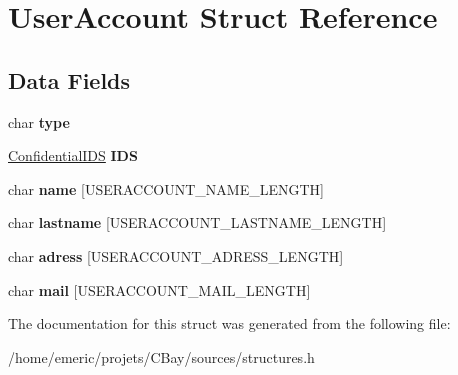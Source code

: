 \hypertarget{struct_user_account}{\section{User\-Account Struct Reference}
\label{struct_user_account}
}
\subsection*{Data Fields}
\begin{DoxyCompactItemize}
\item 
\hypertarget{struct_user_account_aff17911edc8208aa8ddb1c7c52c78389}{char {\bfseries type}}\label{struct_user_account_aff17911edc8208aa8ddb1c7c52c78389}

\item 
\hypertarget{struct_user_account_a588d1e5ad85c65bc2b00e9432faadc0e}{\hyperlink{struct_confidential_i_d_s}{Confidential\-I\-D\-S} {\bfseries I\-D\-S}}\label{struct_user_account_a588d1e5ad85c65bc2b00e9432faadc0e}

\item 
\hypertarget{struct_user_account_ab3f0e8a7b7c292feb10bb01486452533}{char {\bfseries name} \mbox{[}U\-S\-E\-R\-A\-C\-C\-O\-U\-N\-T\-\_\-\-N\-A\-M\-E\-\_\-\-L\-E\-N\-G\-T\-H\mbox{]}}\label{struct_user_account_ab3f0e8a7b7c292feb10bb01486452533}

\item 
\hypertarget{struct_user_account_a570366d76c40b10dee4a3db834bc53be}{char {\bfseries lastname} \mbox{[}U\-S\-E\-R\-A\-C\-C\-O\-U\-N\-T\-\_\-\-L\-A\-S\-T\-N\-A\-M\-E\-\_\-\-L\-E\-N\-G\-T\-H\mbox{]}}\label{struct_user_account_a570366d76c40b10dee4a3db834bc53be}

\item 
\hypertarget{struct_user_account_accd59deb6270e807cd96a582c141e631}{char {\bfseries adress} \mbox{[}U\-S\-E\-R\-A\-C\-C\-O\-U\-N\-T\-\_\-\-A\-D\-R\-E\-S\-S\-\_\-\-L\-E\-N\-G\-T\-H\mbox{]}}\label{struct_user_account_accd59deb6270e807cd96a582c141e631}

\item 
\hypertarget{struct_user_account_aa9bbf7bea4117b927642aee2875821d9}{char {\bfseries mail} \mbox{[}U\-S\-E\-R\-A\-C\-C\-O\-U\-N\-T\-\_\-\-M\-A\-I\-L\-\_\-\-L\-E\-N\-G\-T\-H\mbox{]}}\label{struct_user_account_aa9bbf7bea4117b927642aee2875821d9}

\end{DoxyCompactItemize}


The documentation for this struct was generated from the following file\-:\begin{DoxyCompactItemize}
\item 
/home/emeric/projets/\-C\-Bay/sources/structures.\-h\end{DoxyCompactItemize}
